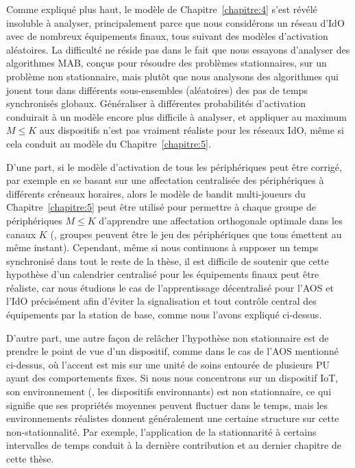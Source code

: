 \begin{resume_fr}
Comme expliqué plus haut, le modèle de Chapitre~\ref{chapitre:4} s'est révélé insoluble à analyser, principalement parce que nous considérons un réseau d'IdO avec de nombreux équipements finaux, tous suivant des modèles d'activation aléatoires.
La difficulté ne réside pas dans le fait que nous essayons d'analyser des algorithmes MAB, conçus pour résoudre des problèmes stationnaires, sur un problème non stationnaire,
mais plutôt que nous analysons des algorithmes qui jouent tous dans différents sous-ensembles (aléatoires) des pas de temps synchronisés globaux.
Généraliser à différentes probabilités d'activation conduirait à un modèle encore plus difficile à analyser, et appliquer au maximum $M \leq K$ aux dispositifs n'est pas vraiment réaliste pour les réseaux IdO, même si cela conduit au modèle du Chapitre~\ref{chapitre:5}.

D'une part, si le modèle d'activation de tous les périphériques peut être corrigé, par exemple en se basant sur une affectation centralisée des périphériques à différents créneaux horaires, alors le modèle de bandit multi-joueurs du Chapitre~\ref{chapitre:5} peut être utilisé pour permettre à chaque groupe de périphériques $M \leq K$ d'apprendre une affectation orthogonale optimale dans les canaux $K$ (\eg, groupes peuvent être le jeu des périphériques que tous émettent au même instant).
%
Cependant, même si nous continuons à supposer un temps synchronisé dans tout le reste de la thèse,
il est difficile de soutenir que cette hypothèse d'un calendrier centralisé pour les équipements finaux peut être réaliste, car nous étudions le cas de l'apprentissage décentralisé pour l'AOS et l'IdO précisément afin d'éviter la signalisation et tout contrôle central des équipements par la station de base, comme nous l'avons expliqué ci-dessus.

D'autre part, une autre façon de relâcher l'hypothèse non stationnaire est de prendre le point de vue d'un dispositif, comme dans le cas de l'AOS mentionné ci-dessus, où l'accent est mis sur une unité de soins entourée de plusieurs PU ayant des comportements fixes.
Si nous nous concentrons sur un dispositif IoT, son environnement (\ie, les dispositifs environnants) est non stationnaire, ce qui signifie que ses propriétés moyennes peuvent fluctuer dans le temps, mais les environnements réalistes donnent généralement une certaine structure sur cette non-stationnalité.
Par exemple, l'application de la stationnarité à certains intervalles de temps conduit à la dernière contribution et au dernier chapitre de cette thèse.



\end{resume_fr}
